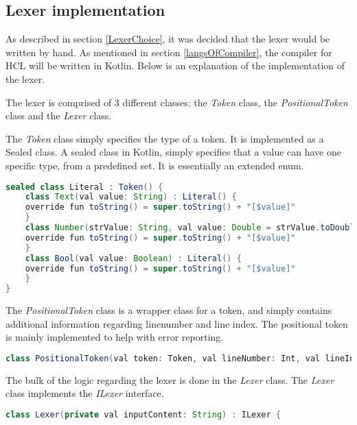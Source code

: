 \subsection{Lexer implementation}
As described in section \ref{LexerChoice}, it was decided that the lexer would be written by hand.
As mentioned in section \ref{langsOfCompiler}, the compiler for HCL will be written in Kotlin.
Below is an explanation of the implementation of the lexer.

The lexer is comprised of 3 different classes: the \textit{Token} class, the \textit{PositionalToken} class and the \textit{Lexer} class.

The \textit{Token} class simply specifies the type of a token. 
It is implemented as a Sealed class. 
A sealed class in Kotlin, simply specifies that a value can have one specific type, from a predefined set\cite{KotlinSealed}.
It is essentially an extended enum.
\begin{lstlisting}[language=java,label=lis:tokenClass,caption=A snippet from the token class .,firstnumber=9]
sealed class Literal : Token() {
	class Text(val value: String) : Literal() {
	override fun toString() = super.toString() + "[$value]"
	}
	class Number(strValue: String, val value: Double = strValue.toDouble()) : Literal() {
	override fun toString() = super.toString() + "[$value]"
	}
	class Bool(val value: Boolean) : Literal() {
	override fun toString() = super.toString() + "[$value]"
	}
}
\end{lstlisting}

The \textit{PositionalToken} class is a wrapper class for a token, and simply contains additional information regarding linenumber and line index.
The positional token is mainly implemented to help with error reporting.
\begin{lstlisting}[language=java,label=lis:PositionalTokenClass,caption=A snippet from the token class .,firstnumber=10]
class PositionalToken(val token: Token, val lineNumber: Int, val lineIndex: Int)
\end{lstlisting}

The bulk of the logic regarding the lexer is done in the \textit{Lexer} class.
The \textit{Lexer} class implements the \textit{ILexer} interface.

\begin{lstlisting}[language=java,label=lis:Lexer,caption=The Lexer .,firstnumber=8]
class Lexer(private val inputContent: String) : ILexer {
\end{lstlisting}

